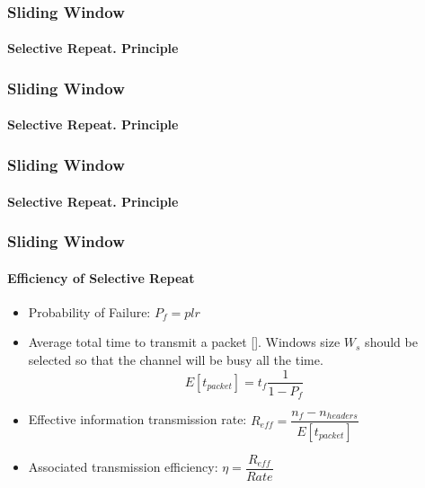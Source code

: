 \begin{frame}		
	\frametitle{Sliding Window}
	\framesubtitle{Selective Repeat. Principle}
	
	\begin{figure}[H]
		\center{\texttt{[image: sr-1]}}
	\end{figure}
	
\end{frame}

\begin{frame}		
	\frametitle{Sliding Window}
	\framesubtitle{Selective Repeat. Principle}
	
	\begin{figure}[H]
		\center{\texttt{[image: sr-2]}}
	\end{figure}
	
\end{frame}

\begin{frame}		
	\frametitle{Sliding Window}
	\framesubtitle{Selective Repeat. Principle}
	
	\begin{figure}[H]
		\center{\texttt{[image: sr-3]}}
	\end{figure}
	
\end{frame}


\begin{frame}		
	\frametitle{Sliding Window}
	\framesubtitle{Efficiency of Selective Repeat}
	
	\begin{itemize}
		\item Probability of Failure: $P_f = plr$
		\item Average total time to transmit a packet [\cite{1}]. Windows size $W_s$ should be selected so that the channel will be busy all the time.
		$$E[t_{packet}] = t_f \dfrac{1}{1 - P_f}$$
		\item Effective information transmission rate: $R_{eff} =\dfrac{n_f - n_{headers}}{E[t_{packet}]} $
		\item Associated transmission efficiency: $\eta = \dfrac{R_{eff}}{Rate}$
\end{itemize}

\end{frame}


